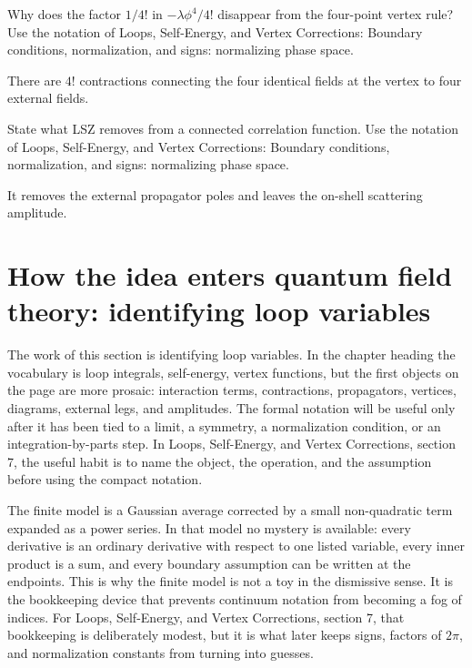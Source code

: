 \begin{exercise}
Why does the factor \(1/4!\) in \(-\lambda\phi^4/4!\) disappear from the four-point vertex rule?  Use the notation of Loops, Self-Energy, and Vertex Corrections: Boundary conditions, normalization, and signs: normalizing phase space.
\begin{answer}
There are \(4!\) contractions connecting the four identical fields at the vertex to four external fields.
\end{answer}
\end{exercise}

\begin{exercise}
State what LSZ removes from a connected correlation function.  Use the notation of Loops, Self-Energy, and Vertex Corrections: Boundary conditions, normalization, and signs: normalizing phase space.
\begin{answer}
It removes the external propagator poles and leaves the on-shell scattering amplitude.
\end{answer}
\end{exercise}



\section{How the idea enters quantum field theory: identifying loop variables}

The work of this section is identifying loop variables.  In the chapter heading the vocabulary is loop integrals, self-energy, vertex functions, but the first objects on the page are more prosaic: interaction terms, contractions, propagators, vertices, diagrams, external legs, and amplitudes.  The formal notation will be useful only after it has been tied to a limit, a symmetry, a normalization condition, or an integration-by-parts step.  In Loops, Self-Energy, and Vertex Corrections, section 7, the useful habit is to name the object, the operation, and the assumption before using the compact notation.

The finite model is a Gaussian average corrected by a small non-quadratic term expanded as a power series.  In that model no mystery is available: every derivative is an ordinary derivative with respect to one listed variable, every inner product is a sum, and every boundary assumption can be written at the endpoints.  This is why the finite model is not a toy in the dismissive sense.  It is the bookkeeping device that prevents continuum notation from becoming a fog of indices.  For Loops, Self-Energy, and Vertex Corrections, section 7, that bookkeeping is deliberately modest, but it is what later keeps signs, factors of \(2\pi\), and normalization constants from turning into guesses.

